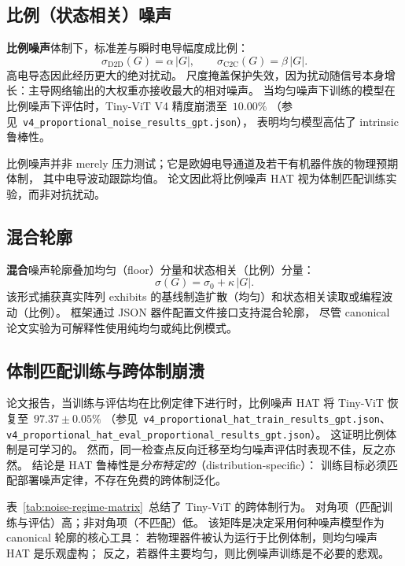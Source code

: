 \subsection{比例（状态相关）噪声}

\textbf{比例噪声}体制下，标准差与瞬时电导幅度成比例：
\begin{equation}
    \sigma_{\mathrm{D2D}}(G) = \alpha\,|G|, \qquad \sigma_{\mathrm{C2C}}(G) = \beta\,|G|.
\end{equation}
高电导态因此经历更大的绝对扰动。
尺度掩盖保护失效，因为扰动随信号本身增长：主导网络输出的大权重亦接收最大的相对噪声。
当均匀噪声下训练的模型在比例噪声下评估时，Tiny-ViT V4 精度崩溃至~$10.00\%$
（参见~\texttt{v4\_proportional\_noise\_results\_gpt.json}），
表明均匀模型高估了 intrinsic 鲁棒性。

比例噪声并非 merely 压力测试；它是欧姆电导通道及若干有机器件族的物理预期体制，
其中电导波动跟踪均值。
论文因此将比例噪声 HAT 视为体制匹配训练实验，而非对抗扰动。

\subsection{混合轮廓}

\textbf{混合}噪声轮廓叠加均匀（floor）分量和状态相关（比例）分量：
\begin{equation}
    \sigma(G) = \sigma_{0} + \kappa\,|G|.
\end{equation}
该形式捕获真实阵列 exhibits 的基线制造扩散（均匀）和状态相关读取或编程波动（比例）。
框架通过 JSON 器件配置文件接口支持混合轮廓，
尽管 canonical 论文实验为可解释性使用纯均匀或纯比例模式。

\subsection{体制匹配训练与跨体制崩溃}

论文报告，当训练与评估均在比例定律下进行时，比例噪声 HAT 将 Tiny-ViT 恢复至~$97.37\pm0.05\%$
（参见~\texttt{v4\_proportional\_hat\_train\_results\_gpt.json}、\texttt{v4\_proportional\_hat\_eval\_proportional\_results\_gpt.json}）。
这证明比例体制是可学习的。
然而，同一检查点反向迁移至均匀噪声评估时表现不佳，反之亦然。
结论是 HAT 鲁棒性是\emph{分布特定的}（distribution-specific）：
训练目标必须匹配部署噪声定律，不存在免费的跨体制泛化。

表~\ref{tab:noise-regime-matrix}~总结了 Tiny-ViT 的跨体制行为。
对角项（匹配训练与评估）高；非对角项（不匹配）低。
该矩阵是决定采用何种噪声模型作为 canonical 轮廓的核心工具：
若物理器件被认为运行于比例体制，则均匀噪声 HAT 是乐观虚构；
反之，若器件主要均匀，则比例噪声训练是不必要的悲观。

